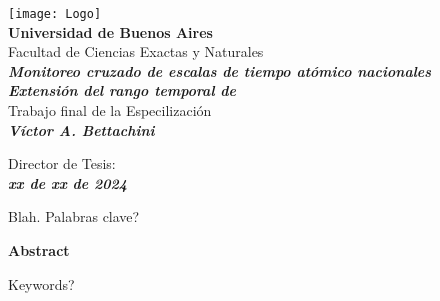 \documentclass[a4paper,twoside,openright]{book}
\newenvironment{abstract}%
{\cleardoublepage\null \vfill\begin{center}%
\thispagestyle{empty}
\bfseries \abstractname \end{center}}%
{\vfill\null}
\begin{document}
\begin{titlepage}
	\begin{center}
		\texttt{[image: Logo]}\\[1cm]
		\textbf{\LARGE Universidad de Buenos Aires}\\
		Facultad de Ciencias Exactas y Naturales\\
  \textit{
		\textbf{Monitoreo cruzado de escalas de tiempo atómico nacionales\\
		Extensión del rango temporal de}}\\
		Trabajo final de la Especilización\\
		\textit{\textbf{Víctor A. Bettachini}}\\[1cm]
	\end{center}
		Director de Tesis: \\
		\textit{\textbf{xx de xx de 2024}}
\end{titlepage}

\newpage
\thispagestyle{empty}

\begin{abstract}
	Blah.
\end{abstract}
Palabras clave?

\newpage
\thispagestyle{empty}
{\cleardoublepage\null \vfill\begin{center}%
\thispagestyle{empty}
\bfseries Abstract \end{center}}%
{\vfill\null}
Keywords?
\end{document}
